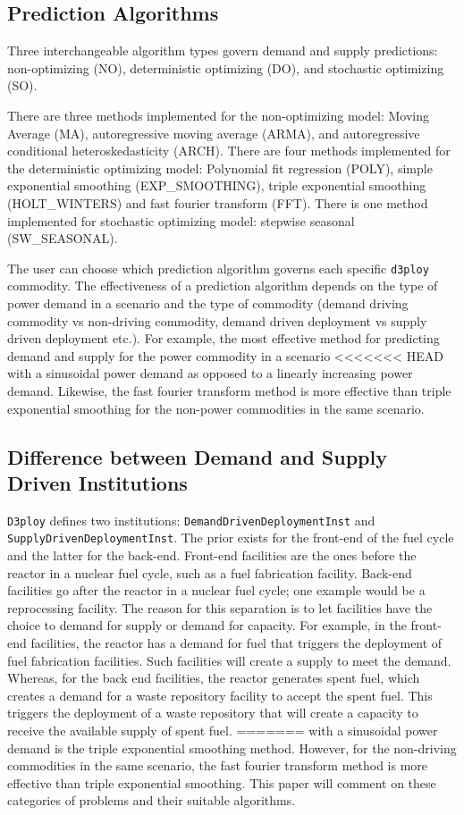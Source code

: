 \documentclass[11pt,letterpaper]{article}
\newcommand{\deploy}{\texttt{d3ploy}\xspace}%
\newcommand{\Deploy}{\texttt{D3ploy}\xspace}%
\begin{document}
\subsection{\textbf{Prediction Algorithms}}
Three interchangeable algorithm types govern demand and supply 
predictions: non-optimizing (NO), deterministic optimizing (DO), and stochastic
optimizing (SO). 

There are three methods implemented for the non-optimizing model: 
Moving Average (MA), autoregressive moving average (ARMA), and autoregressive 
conditional heteroskedasticity (ARCH).
There are four methods implemented for the deterministic optimizing model: 
Polynomial fit regression (POLY), simple exponential smoothing (EXP\_SMOOTHING),  
triple exponential smoothing (HOLT\_WINTERS) and fast fourier 
transform (FFT). 
There is one method implemented for stochastic optimizing model: 
stepwise seasonal (SW\_SEASONAL).  

The user can choose which prediction algorithm governs each specific 
\deploy commodity. 
The effectiveness of a prediction algorithm depends on the type 
of power demand in a scenario and the type of commodity (demand 
driving commodity vs non-driving commodity, demand driven 
deployment vs supply driven deployment etc.). 
For example, the most effective method
for predicting demand and supply for the power commodity in a scenario  
<<<<<<< HEAD
with a sinusoidal power demand as opposed to a linearly increasing power 
demand.
Likewise, the fast fourier transform method is more effective than triple 
exponential smoothing for the non-power commodities in the same 
scenario.  

\subsection{\textbf{Difference between Demand and Supply Driven Institutions}}
\Deploy defines two institutions: \texttt{DemandDrivenDeploymentInst} and \texttt{SupplyDrivenDeploymentInst}. 
The prior exists for the front-end of the fuel cycle and the latter
for the back-end. 
Front-end facilities are the ones before the reactor 
in a nuclear fuel cycle, such as a fuel fabrication facility. 
Back-end facilities go after the reactor in a nuclear 
fuel cycle; one example would be a reprocessing facility. 
The reason for this separation is to let facilities have the choice 
to demand for supply or demand for capacity. 
For example, in the front-end facilities, the reactor has a demand for 
fuel that triggers the deployment of fuel fabrication facilities. Such facilities
will create a supply to meet the demand.
Whereas, for the back end facilities, the reactor generates spent fuel, 
which creates a demand for a waste repository facility to accept the 
spent fuel. This triggers the deployment of a waste repository that
will create a capacity to receive the available supply of spent fuel.
=======
with a sinusoidal power demand is the triple exponential smoothing method. 
However, for the non-driving commodities in the same 
scenario, the fast fourier transform method is more effective than triple 
exponential smoothing. 
This paper will comment on these categories of problems and their suitable
algorithms. 
\end{document}
